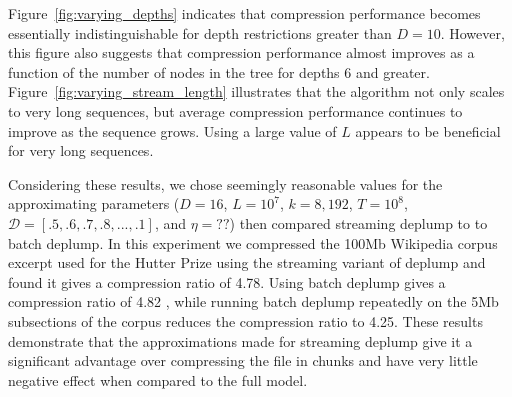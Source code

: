 Figure~\ref{fig:varying_depths} indicates that compression performance becomes essentially indistinguishable for depth restrictions greater than $D=10$.  However, this figure also suggests that compression performance almost improves as a function of the number of nodes in the tree for depths 6 and greater.  Figure~\ref{fig:varying_stream_length} illustrates that the algorithm not only scales to very long sequences, but average compression performance continues to improve as the sequence grows.  Using a large value of $L$ appears to be beneficial for very long sequences.


Considering these results, we chose seemingly reasonable values for the approximating parameters ($D=16$, $L=10^7$, $k=8,192$, $T=10^8$, $\mathcal{D} = [.5, .6, .7, .8, ..., .1]$, and $\eta=??$) then compared streaming deplump to to batch deplump.  In this experiment we compressed the 100Mb Wikipedia corpus excerpt used for the Hutter Prize \citep{Hutter2006} using the streaming variant of deplump and found it gives a compression ratio of 4.78.  Using batch deplump gives a compression ratio of 4.82 \citep{Gasthaus2010}, while running batch deplump repeatedly on the 5Mb subsections of the corpus reduces the compression ratio to 4.25.  These results demonstrate that the approximations made for streaming deplump give it a significant advantage over compressing the file in chunks and have very little negative effect when compared to the full model.





